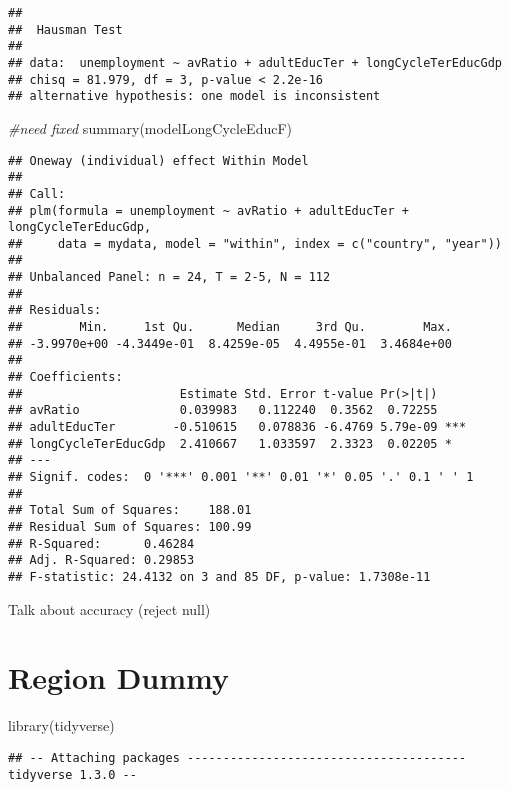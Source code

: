 \documentclass[
]{article}
\newenvironment{Shaded}{\begin{snugshade}}{\end{snugshade}}
\newcommand{\CommentTok}[1]{\textcolor[rgb]{0.56,0.35,0.01}{\textit{#1}}}
\newcommand{\FunctionTok}[1]{\textcolor[rgb]{0.00,0.00,0.00}{#1}}
\newcommand{\NormalTok}[1]{#1}
\begin{document}
\begin{verbatim}
## 
##  Hausman Test
## 
## data:  unemployment ~ avRatio + adultEducTer + longCycleTerEducGdp
## chisq = 81.979, df = 3, p-value < 2.2e-16
## alternative hypothesis: one model is inconsistent
\end{verbatim}

\begin{Shaded}
\begin{Highlighting}[]
\CommentTok{\#need fixed}
\FunctionTok{summary}\NormalTok{(modelLongCycleEducF)}
\end{Highlighting}
\end{Shaded}

\begin{verbatim}
## Oneway (individual) effect Within Model
## 
## Call:
## plm(formula = unemployment ~ avRatio + adultEducTer + longCycleTerEducGdp, 
##     data = mydata, model = "within", index = c("country", "year"))
## 
## Unbalanced Panel: n = 24, T = 2-5, N = 112
## 
## Residuals:
##        Min.     1st Qu.      Median     3rd Qu.        Max. 
## -3.9970e+00 -4.3449e-01  8.4259e-05  4.4955e-01  3.4684e+00 
## 
## Coefficients:
##                      Estimate Std. Error t-value Pr(>|t|)    
## avRatio              0.039983   0.112240  0.3562  0.72255    
## adultEducTer        -0.510615   0.078836 -6.4769 5.79e-09 ***
## longCycleTerEducGdp  2.410667   1.033597  2.3323  0.02205 *  
## ---
## Signif. codes:  0 '***' 0.001 '**' 0.01 '*' 0.05 '.' 0.1 ' ' 1
## 
## Total Sum of Squares:    188.01
## Residual Sum of Squares: 100.99
## R-Squared:      0.46284
## Adj. R-Squared: 0.29853
## F-statistic: 24.4132 on 3 and 85 DF, p-value: 1.7308e-11
\end{verbatim}

Talk about accuracy (reject null)

\hypertarget{region-dummy}{%
\section{Region Dummy}\label{region-dummy}}

\begin{Shaded}
\begin{Highlighting}[]
\FunctionTok{library}\NormalTok{(tidyverse)}
\end{Highlighting}
\end{Shaded}

\begin{verbatim}
## -- Attaching packages --------------------------------------- tidyverse 1.3.0 --
\end{verbatim}
\end{document}
